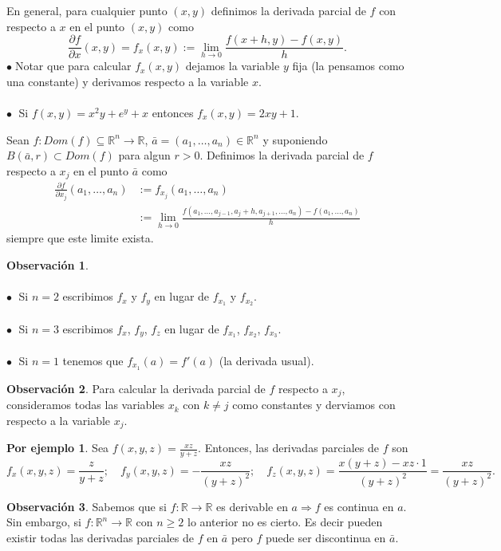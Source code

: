 \documentclass{article}
\theoremstyle{definition}
\theoremstyle{definition}
\newtheorem*{obs}{Observación}
\newtheorem*{ej}{Por ejemplo}
\theoremstyle{remark}
\newcommand\bl{$\bullet\;$}
\begin{document}
En general, para cualquier punto $(x,y)$ definimos la derivada parcial de $f$ con respecto a $x$ en el punto $(x,y)$ como \[
  \frac{\partial f}{\partial x} (x,y) = f_x (x,y) := \lim_{h \to 0}{\frac{f(x+h,y)-f(x,y)}{h}}.
\]
\bl Notar que para calcular $f_x(x,y)$ dejamos la variable $y$ fija (la pensamos como una constante) y derivamos respecto a la variable $x$. \\\\
\bl
  Si $f(x,y)=x^2y+e^y+x$ entonces $f_x(x,y)=2xy+1$.
  \begin{defi}
    Sean $f : Dom(f) \subseteq \mathbb{R}^n \to \mathbb{R}$, $\bar{a}=(a_1,\dots,a_n) \in \mathbb{R}^n$ y suponiendo $B(\bar{a},r) \subset Dom(f)$ para algun $r>0$. Definimos la derivada parcial de $f$ respecto a $x_j$ en el punto $\bar{a}$ como \[\begin{aligned}
      \frac{\partial f}{\partial x_j}(a_1,\dots,a_n) &:= f_{x_j}(a_1,\dots,a_n)
  \\  &:= \lim_{h \to 0}{\frac{f(a_1,\dots,a_{j-1},a_{j}+h,a_{j+1},\dots,a_n)-f(a_1,\dots,a_n)}{h}}
    \end{aligned}
    \] siempre que este limite exista.
  \end{defi}
\begin{obs}
  \; \\\\  
  \textcolor{verdep2}{\bl} Si $n=2$ escribimos $f_x$ y $f_y$ en lugar de $f_{x_1}$ y $f_{x_2}$. \\\\
  \textcolor{verdep2}{\bl} Si $n=3$ escribimos $f_x$, $f_y$, $f_z$ en lugar de $f_{x_1}$, $f_{x_2}$, $f_{x_3}$.\\\\
  \textcolor{verdep2}{\bl} Si $n=1$ tenemos que $f_{x_1}(a)=f'(a)$ \quad (la derivada usual).
\end{obs}
\begin{obs}
  Para calcular la derivada parcial de $f$ respecto a $x_j$, consideramos todas las variables $x_k$ con $k \neq j$ como constantes y derviamos con respecto a la variable $x_j$. 
\end{obs}
\begin{ej}
  Sea $f(x,y,z) = \frac{xz}{y+z}$. Entonces, las derivadas parciales de $f$ son \[ 
    f_x(x,y,z)=\frac{z}{y+z}; \quad f_y(x,y,z)=-\frac{xz}{(y+z)^2}; \quad f_z(x,y,z)=\frac{x(y+z)-xz \cdot 1}{(y+z)^2}=\frac{xz}{(y+z)^2}.
  \] 
\end{ej}
\begin{obs}
  Sabemos que si $f : \mathbb{R} \to \mathbb{R}$ es derivable en $a \Rightarrow f$ es continua en $a$. Sin embargo, si $f: \mathbb{R}^n \to \mathbb{R}$ con $n \geq 2$ lo anterior no es cierto. Es decir pueden existir todas las derivadas parciales de $f$ en $\bar{a}$ pero $f$ puede ser discontinua en $\bar{a}$.\end{obs}
\end{document}
